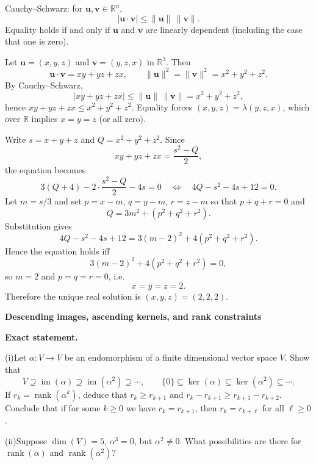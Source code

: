 \begin{solution}

Cauchy--Schwarz: for $\mathbf u,\mathbf v\in\mathbb{R}^n$,
\[
|\mathbf u\cdot \mathbf v|\le \|\mathbf u\|\,\|\mathbf v\|.
\]
Equality holds if and only if $\mathbf u$ and $\mathbf v$ are linearly dependent (including the case that one is zero).

	\par\noindent\textbullet\quad Let $\mathbf u=(x,y,z)$ and $\mathbf v=(y,z,x)$ in $\mathbb{R}^3$. Then
	\[
	\mathbf u\cdot\mathbf v=xy+yz+zx,\qquad
	\|\mathbf u\|^2=\|\mathbf v\|^2=x^2+y^2+z^2.
	\]
	By Cauchy--Schwarz,
	\[
	|xy+yz+zx|\le \|\mathbf u\|\,\|\mathbf v\|=x^2+y^2+z^2,
	\]
	hence $xy+yz+zx\le x^2+y^2+z^2$.
	Equality forces $(x,y,z)=\lambda(y,z,x)$, which over $\mathbb{R}$ implies $x=y=z$ (or all zero).
	\par\noindent\textbullet\quad Write $s=x+y+z$ and $Q=x^2+y^2+z^2$. Since
	\[
	xy+yz+zx=\frac{s^2-Q}{2},
	\]
	the equation becomes
	\[
	3(Q+4)-2\cdot\frac{s^2-Q}{2}-4s=0
	\quad\Longleftrightarrow\quad
	4Q-s^2-4s+12=0.
	\]
	Let $m=s/3$ and set $p=x-m$, $q=y-m$, $r=z-m$ so that $p+q+r=0$ and
	\[
	Q=3m^2+(p^2+q^2+r^2).
	\]
	Substitution gives
	\[
	4Q-s^2-4s+12
	=3(m-2)^2+4(p^2+q^2+r^2).
	\]
	Hence the equation holds iff
	\[
	3(m-2)^2+4(p^2+q^2+r^2)=0,
	\]
	so $m=2$ and $p=q=r=0$, i.e.
	\[
	x=y=z=2.
	\]
	Therefore the unique real solution is $(x,y,z)=(2,2,2)$.
\end{solution}

\begin{problem}[CP-I-0056]
\label{prob:cp-i-0056}
\textbf{Descending images, ascending kernels, and rank constraints}

\textbf{Exact statement.}

	\par\hspace*{1.5em} (i)\quad Let $\alpha:V\to V$ be an endomorphism of a finite dimensional vector space $V$.
	Show that
	\[
	V\supseteq \operatorname{im}(\alpha)\supseteq \operatorname{im}(\alpha^2)\supseteq \cdots,\qquad
	\{0\}\subseteq \ker(\alpha)\subseteq \ker(\alpha^2)\subseteq \cdots.
	\]
	If $r_k=\operatorname{rank}(\alpha^k)$, deduce that $r_k\ge r_{k+1}$ and
	$r_k-r_{k+1}\ge r_{k+1}-r_{k+2}$.
	Conclude that if for some $k\ge 0$ we have $r_k=r_{k+1}$, then $r_k=r_{k+\ell}$ for all $\ell\ge 0$.
	\par\noindent (ii)\quad Suppose $\dim(V)=5$, $\alpha^3=0$, but $\alpha^2\ne 0$.
	What possibilities are there for $\operatorname{rank}(\alpha)$ and $\operatorname{rank}(\alpha^2)$?
\end{problem}

